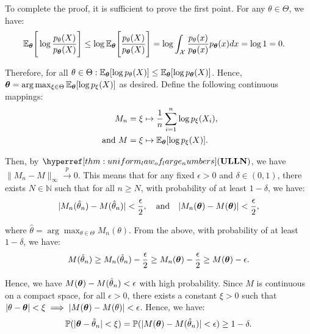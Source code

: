 \begin{proof*}
\begin{proof*}
    \noindent To complete the proof, it is sufficient to prove the first point. For any $\theta\in\Theta$, we have:
    \begin{align*}
        \mathbb{E}_{\boldsymbol{\theta}}\Bigg[ 
            \log \frac{p_\theta(X)}{p_{\boldsymbol{\theta}}(X)}
         \Bigg] &\le \log\mathbb{E}_{\boldsymbol{\theta}}\Bigg[ 
            \frac{p_\theta(X)}{p_{\boldsymbol{\theta}}(X)}
         \Bigg] = \log\int_\mathcal{X} \frac{p_\theta(x)}{p_{\boldsymbol{\theta}}(x)}p_{\boldsymbol{\theta}}(x)dx = \log 1 = 0.
    \end{align*} 

    \noindent Therefore, for all $\theta\in\Theta:\mathbb{E}_{\boldsymbol{\theta}}[\log p_\theta(X)]\le \mathbb{E}_{\boldsymbol{\theta}}[\log p_{\boldsymbol{\theta}}(X)]$. Hence, $\boldsymbol{\theta}=\arg\max_{\xi\in\Theta}\mathbb{E}_{\boldsymbol{\theta}} [\log p_\xi(X)]$ as desired. Define the following continuous mappings:
    \begin{align*}
        M_n &= \xi \mapsto \frac{1}{n} \sum_{i=1}^n \log p_\xi(X_i), \\
        \text{ and } M &= \xi \mapsto \mathbb{E}_{\boldsymbol{\theta}}[\log p_\xi(X)]. 
    \end{align*} 

    \noindent Then, by $\ULLN$, we have $\|M_n - M\|_\infty \xrightarrow{p} 0$. This means that for any fixed $\epsilon>0$ and $\delta\in(0,1)$, there exists $N\in\mathbb{N}$ such that for all $n\ge N$, with probability of at least $1-\delta$, we have:
    \begin{align*}
        |M_n(\hat\theta_n) - M(\hat\theta_n)| < \frac{\epsilon}{2}, \quad \text{and} \quad |M_n(\boldsymbol{\theta}) - M(\boldsymbol{\theta})| < \frac{\epsilon}{2},
    \end{align*} 

    \noindent where $\hat\theta = \arg\max_{\theta\in\Theta}M_n(\theta)$. From the above, with probability of at least $1-\delta$, we have:
    \begin{align*}
        M(\hat\theta_n) \ge M_n(\hat\theta_n) - \frac{\epsilon}{2} \ge M_n(\boldsymbol{\theta}) - \frac{\epsilon}{2} \ge M(\boldsymbol{\theta}) - \epsilon.
    \end{align*} 

    \noindent Hence, we have $M(\boldsymbol{\theta}) - M(\hat\theta_n) < \epsilon$ with high probability. Since $M$ is continuous on a compact space, for all $\epsilon>0$, there exists a constant $\xi>0$ such that $|\theta - \boldsymbol{\theta}| < \xi \implies |M(\boldsymbol{\theta}) - M(\theta)|<\epsilon$. Hence, we have:
    \begin{align*}
        \mathbb{P}(|\boldsymbol{\theta} - \hat\theta_n| < \xi) = \mathbb{P}(|M(\boldsymbol{\theta})-M(\hat\theta_n)| < \epsilon) \ge 1 - \delta.  
    \end{align*}   


\end{proof*}
\end{proof*}
